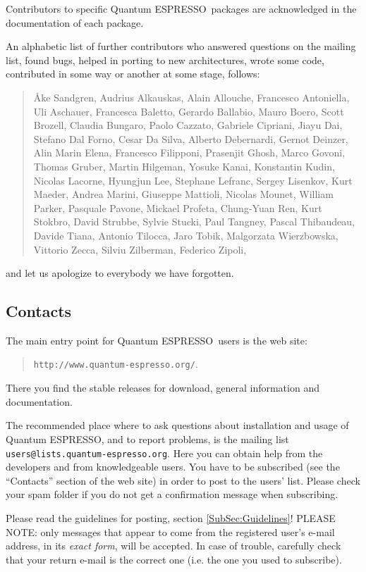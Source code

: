 \documentclass[12pt,a4paper]{article}
\def\qe{{\sc Quantum ESPRESSO}}
\begin{document}
Contributors to specific \qe\ packages are acknowledged in the
documentation of each package.

An alphabetic list of further
contributors who answered questions on the mailing list, found
bugs, helped in porting to new architectures, wrote some code,
contributed in some way or another at some stage, follows:
\begin{quote}
  {\AA}ke Sandgren, Audrius Alkauskas, Alain Allouche, Francesco Antoniella,
  Uli Aschauer, Francesca Baletto, Gerardo Ballabio, Mauro Boero,
  Scott Brozell, Claudia Bungaro, Paolo Cazzato, Gabriele Cipriani,
  Jiayu Dai, Stefano Dal Forno, Cesar Da Silva, Alberto Debernardi,
  Gernot Deinzer, Alin Marin Elena, Francesco Filipponi, Prasenjit Ghosh,
  Marco Govoni, Thomas Gruber, Martin Hilgeman, Yosuke Kanai, Konstantin Kudin,
  Nicolas Lacorne, Hyungjun Lee, Stephane Lefranc, Sergey Lisenkov, Kurt Maeder,
  Andrea Marini, Giuseppe Mattioli, Nicolas Mounet, William Parker,
  Pasquale Pavone, Mickael Profeta, Chung-Yuan Ren,
  Kurt Stokbro, David Strubbe, Sylvie Stucki, Paul Tangney, Pascal Thibaudeau,
  Davide Tiana, Antonio Tilocca, Jaro Tobik, Malgorzata Wierzbowska,
  Vittorio Zecca, Silviu Zilberman, Federico Zipoli,
\end{quote}
and let us apologize to everybody we have forgotten.

\subsection{Contacts}
\label{SubSec:Contacts}

The main entry point for \qe\ users is the web site:
\begin{quote}
\texttt{http://www.quantum-espresso.org/}. 
\end{quote}
There you find
the stable releases for download, general information and
documentation.

The recommended place where to ask questions about installation
and usage of \qe, and to report problems, is the
mailing list \texttt{users@lists.quantum-espresso.org}.
Here you can obtain help from the developers and from
knowledgeable users. You have to be subscribed (see the ``Contacts''
section of the web site) in order to post to the  users' list.
Please check your spam folder if you do not get a confirmation
message when subscribing.

Please read the guidelines for posting, section \ref{SubSec:Guidelines}!
PLEASE NOTE: only messages that appear to come from the
registered user's e-mail address, in its {\em exact form}, will be
accepted. In case of trouble, carefully check that your return
e-mail is the correct one (i.e. the one you used to subscribe).
\end{document}
